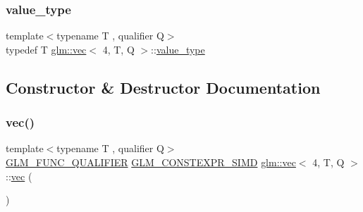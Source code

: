 \mbox{\label{structglm_1_1vec_3_014_00_01_t_00_01_q_01_4_a020e92356dcff10cc371130596325415}} 
\subsubsection{\texorpdfstring{value\+\_\+type}{value\_type}}
{\footnotesize\ttfamily template$<$typename T , qualifier Q$>$ \\
typedef T \hyperlink{structglm_1_1vec}{glm\+::vec}$<$ 4, T, Q $>$\+::\hyperlink{structglm_1_1vec_3_014_00_01_t_00_01_q_01_4_a020e92356dcff10cc371130596325415}{value\+\_\+type}}



\subsection{Constructor \& Destructor Documentation}
\mbox{\label{structglm_1_1vec_3_014_00_01_t_00_01_q_01_4_a7ab4da90825b52bb9a7ef01268ac4d54}} 
\subsubsection{\texorpdfstring{vec()}{vec()}\hspace{0.1cm}{\footnotesize\ttfamily [1/34]}}
{\footnotesize\ttfamily template$<$typename T , qualifier Q$>$ \\
\hyperlink{setup_8hpp_a33fdea6f91c5f834105f7415e2a64407}{G\+L\+M\+\_\+\+F\+U\+N\+C\+\_\+\+Q\+U\+A\+L\+I\+F\+I\+ER} \hyperlink{setup_8hpp_ae5de828d10226b21e2123dd61f3cb5ed}{G\+L\+M\+\_\+\+C\+O\+N\+S\+T\+E\+X\+P\+R\+\_\+\+S\+I\+MD} \hyperlink{structglm_1_1vec}{glm\+::vec}$<$ 4, T, Q $>$\+::\hyperlink{structglm_1_1vec}{vec} (\begin{DoxyParamCaption}{ }\end{DoxyParamCaption})}

\mbox{\label{structglm_1_1vec_3_014_00_01_t_00_01_q_01_4_ad218b24398db0a16b0df3a0e64f6f638}} 
